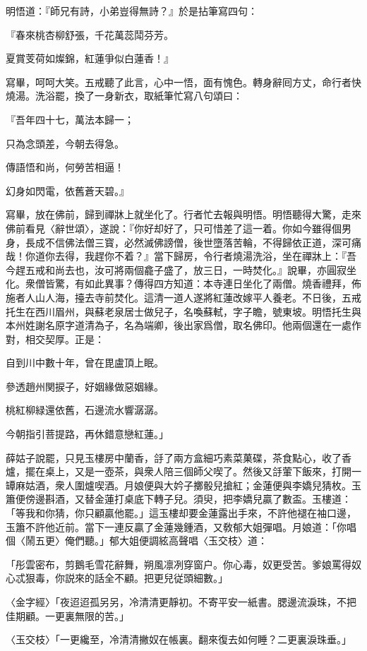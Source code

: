 明悟道：『師兄有詩，小弟豈得無詩？』於是拈筆寫四句：

『春來桃杏柳舒張，千花萬蕊鬦芬芳。

夏賞芰荷如燦錦，紅蓮爭似白蓮香！』

寫畢，呵呵大笑。五戒聽了此言，心中一悟，面有愧色。轉身辭囘方丈，命行者快燒湯。洗浴罷，換了一身新衣，取紙筆忙寫八句頌曰：

『吾年四十七，萬法本歸一；

只為念頭差，今朝去得急。　

傳語悟和尚，何勞苦相逼！

幻身如閃電，依舊蒼天碧。』

寫畢，放在佛前，歸到禪牀上就坐化了。行者忙去報與明悟。明悟聽得大驚，走來佛前看見〈辭世頌〉，遂說：『你好却好了，只可惜差了這一着。你如今雖得個男身，長成不信佛法僧三寳，必然滅佛謗僧，後世墮落苦輪，不得歸依正道，深可痛哉！你道你去得，我趕你不着？』當下歸房，令行者燒湯洗浴，坐在禪牀上：『吾今趕五戒和尚去也，汝可將兩個龕子盛了，放三日，一時焚化。』說畢，亦圓寂坐化。衆僧皆驚，有如此異事？傳得四方知道：本寺連日坐化了兩僧。燒香禮拜，佈施者人山人海，擡去寺前焚化。這清一道人遂將紅蓮改嫁平人養老。不日後，五戒托生在西川眉州，與蘇老泉居士做兒子，名喚蘇軾，字子瞻，號東坡。明悟托生與本州姓謝名原字道清為子，名為端卿，後出家爲僧，取名佛印。他兩個還在一處作對，相交契厚。正是：

自到川中數十年，曾在毘盧頂上眠。

參透趙州関捩子，好姻緣做惡姻緣。

桃紅柳緑還依舊，石邊流水響潺潺。

今朝指引菩提路，再休錯意戀紅蓮。」

薛姑子說罷，只見玉樓房中蘭香，㧱了兩方盒細巧素菜菓碟，茶食點心，收了香爐，擺在桌上，又是一壺茶，與衆人陪三個師父喫了。然後又㧱葷下飯來，打開一罈麻姑酒，衆人圍爐喫酒。月娘便與大妗子擲骰兒搶紅；金蓮便與李嬌兒猜枚。玉簫便傍邊斟酒，又替金蓮打桌底下轉子兒。須臾，把李嬌兒贏了數盃。玉樓道：「等我和你猜，你只顧贏他罷。」這玉樓却要金蓮露出手來，不許他褪在袖口邊，玉簫不許他近前。當下一連反贏了金蓮幾鍾酒，又敎郁大姐彈唱。月娘道：「你唱個〈鬧五更〉俺們聽。」郁大姐便調絃高聲唱〈玉交枝〉道：

「彤雲密布，剪鵝毛雪花辭舞，朔風凛冽穿窗户。你心毒，奴更受苦。爹娘罵得奴心忒狠毒，你説來的話全不顧。把更兒従頭細數。」

〈金字經〉「夜迢迢孤另另，冷清清更靜初。不寄平安一紙書。腮邊流淚珠，不把佳期顧。一更裏無限的苦。」

〈玉交枝〉「一更纔至，冷清清撇奴在帳裏。翻來復去如何睡？二更裏淚珠垂。」


